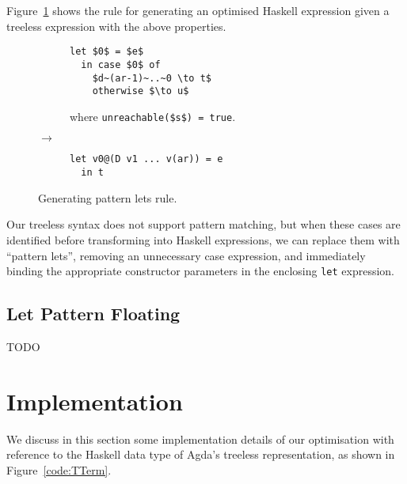 Figure~\ref{fig:plet_rule} shows the rule for generating an optimised Haskell expression given a treeless expression with the above properties.

\begin{figure}[h]
\centering
\begin{subfigure}{.47\textwidth}
  \begin{lstlisting}[style=math]
  let $0$ = $e$
  in case $0$ of
    $d~(ar-1)~..~0 \to t$
    otherwise $\to u$
  \end{lstlisting}
  where \lstinline[style=math]{unreachable($s$) = true}.
\end{subfigure}
{\large$\to$}
\begin{subfigure}{.47\textwidth}
  \begin{lstlisting}[style=blockhaskell]
  let v0@(D v1 ... v(ar)) = e
  in t
  \end{lstlisting}
\end{subfigure}
\caption{Generating pattern lets rule.}
\label{fig:plet_rule}
\end{figure}


Our treeless syntax does not support pattern matching, but when these cases are identified before transforming into Haskell expressions, we can replace them with ``pattern lets'', removing an unnecessary case expression, and immediately binding the appropriate constructor parameters in the enclosing \lstinline{let} expression.

\subsection{Let Pattern Floating}


TODO

\section{Implementation}
\label{sec:implementation}

We discuss in this section some implementation details of our optimisation with reference to the Haskell data type of Agda's treeless representation, as shown in Figure~\ref{code:TTerm}.

